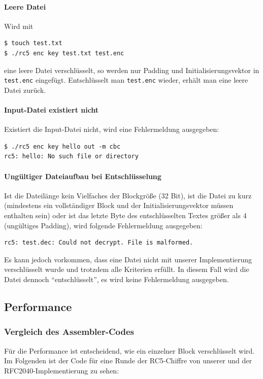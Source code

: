 \documentclass[course=erap]{aspdoc}
\begin{document}
\paragraph{Leere Datei} Wird mit 
\begin{verbatim}
$ touch test.txt
$ ./rc5 enc key test.txt test.enc
\end{verbatim} eine leere Datei verschlüsselt, so werden nur Padding und Initialisierungsvektor in \texttt{test.enc} eingefügt. Entschlüsselt man \texttt{test.enc} wieder, erhält man eine leere Datei zurück.

\paragraph{Input-Datei existiert nicht} Existiert die Input-Datei nicht, wird eine Fehlermeldung ausgegeben:
\begin{verbatim}
$ ./rc5 enc key hello out -m cbc
rc5: hello: No such file or directory
\end{verbatim}

\paragraph{Ungültiger Dateiaufbau bei Entschlüsselung} Ist die Dateilänge kein Vielfaches der Blockgröße (32 Bit), ist die Datei zu kurz (mindestens ein vollständiger Block und der Initialisierungsvektor müssen enthalten sein) oder ist das letzte Byte des entschlüsselten Textes größer als 4 (ungültiges Padding), wird folgende Fehlermeldung ausgegeben:
\begin{verbatim}
rc5: test.dec: Could not decrypt. File is malformed.
\end{verbatim}

Es kann jedoch vorkommen, dass eine Datei nicht mit unserer Implementierung verschlüsselt wurde und trotzdem alle Kriterien erfüllt. In diesem Fall wird die Datei dennoch ``entschlüsselt'', es wird keine Fehlermeldung ausgegeben.

\subsection{Performance}

\subsubsection{Vergleich des Assembler-Codes}

Für die Performance ist entscheidend, wie ein einzelner Block verschlüsselt wird. Im Folgenden ist der Code für eine Runde der RC5-Chiffre von unserer und der RFC2040-Implementierung zu sehen:
\end{document}
